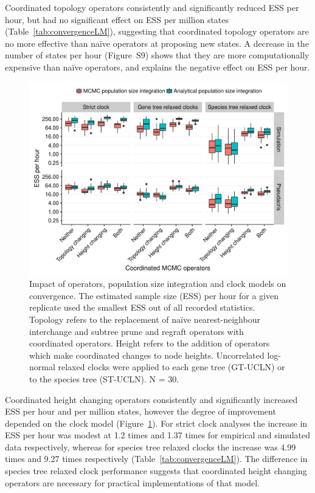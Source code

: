 \documentclass[nogrid]{MBE}%
\begin{document}
Coordinated topology operators consistently and significantly reduced ESS
per hour, but had no significant effect on ESS per million states
(Table~\ref{tab:convergenceLM}), suggesting that coordinated topology
operators are no more effective than na\"ive operators at proposing new
states. A decrease in the number of states per hour (Figure~S9) shows that
they are more computationally expensive than na\"ive operators, and explains
the negative effect on ESS per hour.

\begin{figure}[htb!]
\centering
\includegraphics[width=130mm]{minimum-ess_per_hour-starbeast2.pdf}
\caption
{Impact of operators, population size integration and clock models on
convergence. The estimated sample size (ESS) per hour for a given replicate
used the smallest ESS out of all recorded statistics. Topology refers to the
replacement of na\"ive nearest-neighbour interchange and subtree prune and
regraft operators with coordinated operators. Height refers to the addition of
operators which make coordinated changes to node heights. Uncorrelated log-normal relaxed clocks were applied to each gene tree (GT-UCLN) or to
the species tree (ST-UCLN). N = 30.}
\label{fig:realEssPerHour}
\end{figure}

Coordinated height changing operators consistently and significantly
increased ESS per hour and per million states, however the degree of
improvement depended on the clock model (Figure~\ref{fig:realEssPerHour}). For
strict clock analyses the increase in ESS per hour was modest at 1.2 times and
1.37 times for empirical and simulated data respectively, whereas for species
tree relaxed clocks the increase was 4.99 times and 9.27 times respectively
(Table~\ref{tab:convergenceLM}). The difference in species tree relaxed clock
performance suggests that coordinated height changing operators are necessary
for practical implementations of that model.
\end{document}
